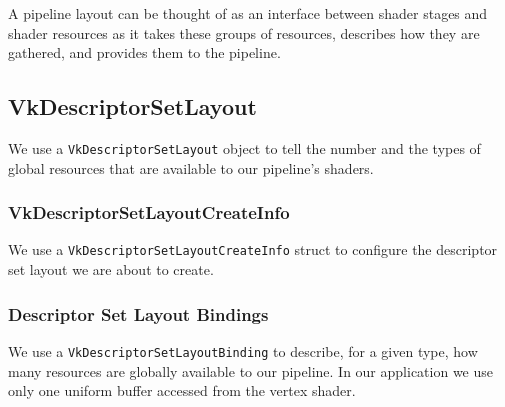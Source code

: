A pipeline layout can be thought of as an interface between shader stages
and shader resources as it takes these groups of resources, describes how
they are gathered, and provides them to the pipeline.

\begin{minipage}{\linewidth}{\noindent}
    
\end{minipage}

\subsection{VkDescriptorSetLayout}

We use a \texttt{VkDescriptorSetLayout} object to tell the number and the types
of global resources that are available to our pipeline's shaders.

\begin{minipage}{\linewidth}{\noindent}
    
\end{minipage}

\subsubsection{VkDescriptorSetLayoutCreateInfo}

We use a \texttt{VkDescriptorSetLayoutCreateInfo} struct to configure the
descriptor set layout we are about to create.

\begin{minipage}{\linewidth}{\noindent}
    
\end{minipage}

\subsubsection{Descriptor Set Layout Bindings}

We use a \texttt{VkDescriptorSetLayoutBinding} to describe, for a given type,
how many resources are globally available to our pipeline.
In our application we use only one uniform buffer accessed from the vertex shader.

